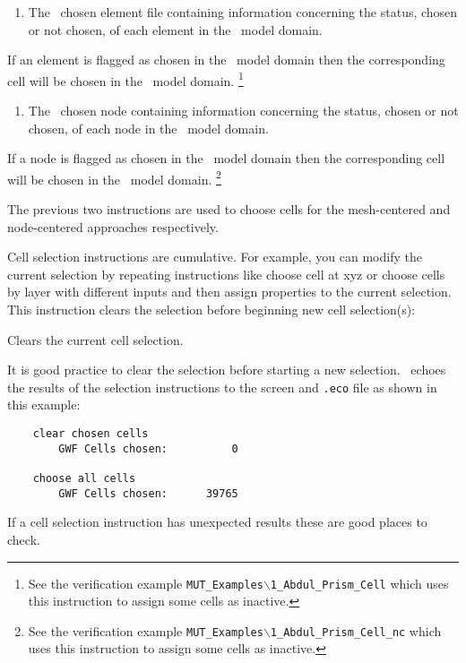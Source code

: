 {\pagebreak
{}
    {
        \squish
        \begin{enumerate}
        \item {}  The \gb\ chosen element file  containing information concerning the status, chosen or not chosen, of each element in the \gb\ model domain.
        \end{enumerate}
          If an element is flagged as chosen in the \gb\ model domain then the corresponding cell will be chosen in the \mfus\ model domain.  \footnote{ See the verification example \texttt{MUT\_Examples$\backslash$1\_Abdul\_Prism\_Cell} which uses this instruction to assign some cells as inactive.}
    }

    {
        \squish
        \begin{enumerate}
        \item {}  The \gb\ chosen node  containing information concerning the status, chosen or not chosen, of each node in the \gb\ model domain.
        \end{enumerate}
          If a node is flagged as chosen in the \gb\ model domain then the corresponding cell will be chosen in the \mfus\ model domain.  \footnote{ See the verification example \texttt{MUT\_Examples$\backslash$1\_Abdul\_Prism\_Cell\_nc} which uses this instruction to assign some cells as inactive.}
    }

The previous two instructions are used to choose cells for the mesh-centered and node-centered approaches respectively.

Cell selection instructions are cumulative.  For example, you can modify the current selection by repeating instructions like  \textsf{choose cell at xyz} or \textsf{choose cells by layer} with different inputs and then assign properties to the current selection.  This instruction clears the selection before beginning new cell selection(s):

    {Clears the current cell selection.
     }

It is good practice to clear the selection before starting a new selection. \mut\ echoes the results of the selection instructions to the screen and \texttt{.eco} file as shown in this example:
\begin{verbatim}
    clear chosen cells
    	GWF Cells chosen:          0

    choose all cells
    	GWF Cells chosen:      39765
\end{verbatim}
If a cell selection instruction has unexpected results these are good places to check.

}
